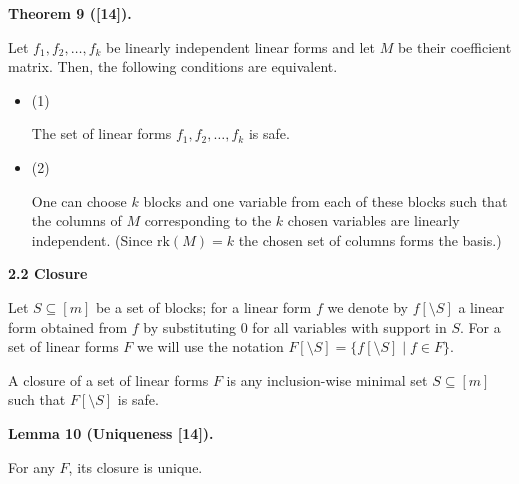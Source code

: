 \documentclass[10pt,a4paper]{article}
\begin{document}
\par\medskip\noindent\textbf{
Theorem 9 ([14]).
}\par



Let $f_{1},f_{2},\dots,f_{k}$ be linearly independent linear forms and let $M$ be their coefficient matrix. Then, the following conditions are equivalent.\par


\begin{itemize}


\item 
(1) 


The set of linear forms $f_{1},f_{2},\dots,f_{k}$ is safe.\par





\item 
(2) 


One can choose $k$ blocks and one variable from each of these blocks such that the columns of $M$ corresponding to the $k$ chosen variables are linearly independent. (Since $\mathrm{rk}(M)=k$ the chosen set of columns forms the basis.)\par





\end{itemize}



\par\medskip\noindent\textbf{
2.2 Closure}\par


Let $S\subseteq[m]$ be a set of blocks;
for a linear form $f$ we denote by $f[\setminus S]$ a linear form obtained from $f$ by substituting $0$ for all variables with support in $S$. For a set of linear forms $F$ we will use the notation $F[\setminus S]=\{f[\setminus S]\mid f\in F\}$.\par



A closure of a set of linear forms $F$ is any inclusion-wise minimal set $S\subseteq[m]$ such that $F[\setminus S]$ is safe.\par



\par\medskip\noindent\textbf{
Lemma 10 (Uniqueness [14]).
}\par



For any $F$, its closure is unique.\par
\end{document}

